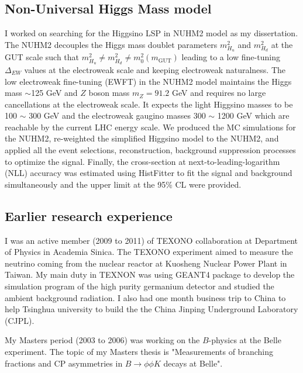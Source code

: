\documentclass[12pt]{article}
\begin{document}
\subsection{Non-Universal Higgs Mass model}
I worked on searching for the Higgsino LSP in NUHM2 model as my dissertation.
The NUHM2 decouples the Higgs mass doublet parameters $m^{2}_{H_{u}}$ and $m^{2}_{H_{d}}$ at the GUT scale such that $m^{2}_{H_{u}} \neq m^{2}_{H_{d}} \neq m^{2}_{0}(m_{\textrm{GUT}})$ leading to a low fine-tuning $\Delta_{EW}$ values at the electroweak scale and keeping electroweak naturalness.
The low electroweak fine-tuning (EWFT) in the NUHM2 model maintains the Higgs mass $\sim$125 GeV and $Z$ boson mass $m_{Z} = 91.2$ GeV and requires no large cancellations at the electroweak scale. 
It expects the light Higgsino masses to be 100 $\sim$ 300 GeV and the electroweak gaugino masses 300 $\sim$ 1200 GeV which are reachable by the current LHC energy scale.
We produced the MC simulations for the NUHM2, re-weighted the simplified Higgsino model to the NUHM2, and applied all the event selections, reconstruction, background suppression processes to optimize the signal.
Finally, the cross-section at next-to-leading-logarithm (NLL) accuracy was estimated using HistFitter to fit the signal and background simultaneously and the upper limit at the 95\% CL were provided.

\subsection{Earlier research experience}
I was an active member (2009 to 2011) of TEXONO collaboration at Department of Physics in Academia Sinica.
The TEXONO experiment aimed to measure the neutrino coming from the nuclear reactor at Kuosheng Nuclear Power Plant in Taiwan.
My main duty in TEXNON was using GEANT4 package to develop the simulation program of the high purity germanium detector and studied the ambient background radiation.
I also had one month business trip to China to help Tsinghua university to build the the China Jinping Underground Laboratory (CJPL).

My Masters period (2003 to 2006) was working on the $B$-physics at the Belle experiment.
The topic of my Masters thesis is "Measurements of branching fractions and CP asymmetries in $B \to \phi \phi K$ decays at Belle".~\cite{Abe:2006qy, Shen:2008pr}
\end{document}
